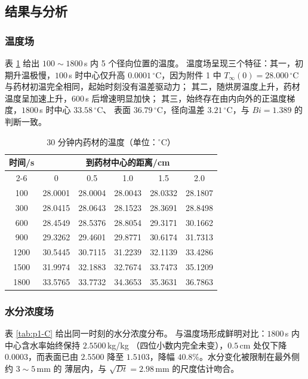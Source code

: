 \documentclass[12pt,a4paper]{ctexart}
\begin{document}
\subsection{结果与分析}

\subsubsection{温度场}

表 \ref{tab:p1-T} 给出 $100\sim1800$\,s 内 5 个径向位置的温度。
温度场呈现三个特征：其一，初期升温极慢，$100$\,s 时中心仅升高
$0.0001\,^\circ$C，因为附件 1 中 $T_\infty(0)=28.000\,^\circ$C
与药材初温完全相同，起始时刻没有温差驱动力；
其二，随烘房温度上升，药材温度呈加速上升，$600$\,s 后增速明显加快；
其三，始终存在由内向外的正温度梯度，$1800$\,s 时中心 $33.58\,^\circ$C、
表面 $36.79\,^\circ$C，径向温差 $3.21\,^\circ$C，与 $Bi=1.389$ 的判断一致。

\begin{table}[htbp]
  \centering
  \caption{30 分钟内药材的温度（单位：$^\circ$C）}
  \label{tab:p1-T}
  \begin{tabular}{cccccc}
    \toprule
    \multirow{2}{*}{时间/s} & \multicolumn{5}{c}{到药材中心的距离/cm} \\
    \cmidrule(lr){2-6}
     & 0     & 0.5   & 1.0   & 1.5   & 2.0 \\
    \midrule
    100  & 28.0001 & 28.0004 & 28.0043 & 28.0332 & 28.1807 \\
    300  & 28.0415 & 28.0643 & 28.1523 & 28.3691 & 28.8498 \\
    600  & 28.4549 & 28.5376 & 28.8054 & 29.3171 & 30.1662 \\
    900  & 29.3262 & 29.4601 & 29.8771 & 30.6174 & 31.7313 \\
    1200 & 30.5445 & 30.7115 & 31.2239 & 32.1139 & 33.4286 \\
    1500 & 31.9974 & 32.1883 & 32.7674 & 33.7473 & 35.1209 \\
    1800 & 33.5765 & 33.7732 & 34.3653 & 35.3631 & 36.7863 \\
    \bottomrule
  \end{tabular}
\end{table}

\subsubsection{水分浓度场}

表 \ref{tab:p1-C} 给出同一时刻的水分浓度分布。
与温度场形成鲜明对比：$1800$\,s 内中心含水率始终保持 $2.5500$\,kg/kg
（四位小数内完全未变），$0.5$\,cm 处仅下降 $0.0003$，而表面已由 $2.5500$
降至 $1.5103$，降幅 $40.8\%$。水分变化被限制在最外侧约 $3\sim5$\,mm 的
薄层内，与 $\sqrt{Dt}=2.98$\,mm 的尺度估计吻合。
\end{document}
